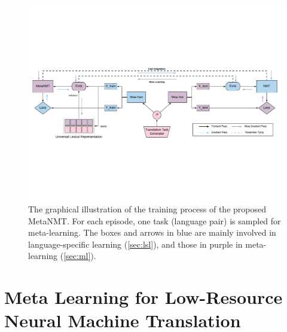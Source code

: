 
\begin{figure}[hptb]
    \centering
    \includegraphics[width=\linewidth]{figs/meta/framework.pdf}
    \caption{The graphical illustration of the training process of the proposed MetaNMT. For each episode, one task (language pair) is sampled for meta-learning. The boxes and arrows in blue are mainly involved in language-specific learning (\textsection\ref{sec:lsl}), and those in purple in meta-learning (\textsection\ref{sec:ml}).}
    \label{fig:famework}
\end{figure}


\section{Meta Learning for Low-Resource Neural Machine Translation}
\label{sec:maml-mt}

